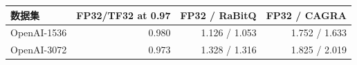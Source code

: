 \begin{tabular}{@{}lrrr@{}}
\toprule
数据集 & FP32/TF32 at 0.97 & FP32 / RaBitQ & FP32 / CAGRA \\
\midrule
OpenAI-1536 & 0.980 & 1.126 / 1.053 & 1.752 / 1.633 \\
OpenAI-3072 & 0.973 & 1.328 / 1.316 & 1.825 / 2.019 \\
\bottomrule
\end{tabular}
